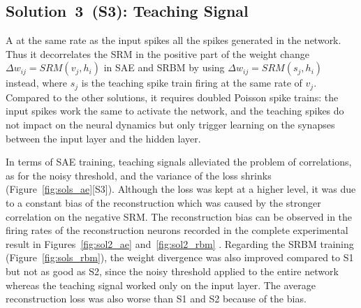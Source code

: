 \subsection{Solution~3~(S3): Teaching Signal}
A \DIFdelbegin {}\DIFdelend \DIFaddbegin {}\DIFaddend at the same rate as the input spikes \DIFdelbegin {}\DIFdelend \DIFaddbegin {}\DIFaddend all the spikes generated in the network.
\DIFaddbegin {}\DIFaddend Thus it decorrelates the \DIFaddbegin {}\DIFaddend SRM in the positive part of the weight change $\Delta w_{ij} = SRM(v_j,h_i)$ in SAE and SRBM by using $\Delta w_{ij}=SRM(s_j,h_i)$ instead, where $s_j$ is the teaching spike train firing at the same rate of $v_j$.
Compared to the other solutions, it requires doubled Poisson spike trains: the input spikes work the same to activate the network, and the teaching spikes do not impact on the neural dynamics but only trigger learning on the synapses between the input layer and the hidden layer.

In terms of SAE training, teaching signals alleviated the problem of correlations, as for the noisy threshold, and the variance of the loss shrinks (Figure~\ref{fig:sols_ae}[S3]).
Although the loss was kept at a higher level, it was due to a constant bias of the reconstruction which was caused by the stronger correlation on the negative SRM.
The reconstruction bias can be observed in the firing rates of the reconstruction neurons recorded in the complete experimental result in Figures~\ref{fig:sol2_ae} and~\ref{fig:sol2_rbm} \DIFdelbegin {}\DIFdelend \DIFaddbegin {}\DIFaddend .
Regarding the SRBM training (Figure~\ref{fig:sols_rbm}), the weight divergence was also improved compared to S1 but not as good as S2, since the noisy threshold applied to the entire network whereas the teaching signal worked only on the input layer.
The average reconstruction loss was also worse than S1 and S2 because of the bias. 

